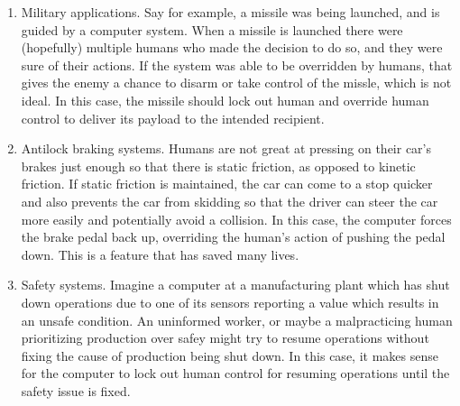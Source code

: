 \begin{enumerate}
  \item Military applications. Say for example, a missile was being launched,
    and is guided by a computer system. When a missile is launched there were
    (hopefully) multiple humans who made the decision to do so, and they were
    sure of their actions. If the system was able to be overridden by humans,
    that gives the enemy a chance to disarm or take control of the missle, which
    is not ideal. In this case, the missile should lock out human and override
    human control to deliver its payload to the intended recipient.

  \item Antilock braking systems. Humans are not great at pressing on their
    car's brakes just enough so that there is static friction, as opposed to
    kinetic friction. If static friction is maintained, the car can come to a
    stop quicker and also prevents the car from skidding so that the driver can
    steer the car more easily and potentially avoid a collision. In this case,
    the computer forces the brake pedal back up, overriding the human's action
    of pushing the pedal down. This is a feature that has saved many lives.

  \item Safety systems. Imagine a computer at a manufacturing plant which has
    shut down operations due to one of its sensors reporting a value which
    results in an unsafe condition. An uninformed worker, or maybe a
    malpracticing human prioritizing production over safey might try to resume
    operations without fixing the cause of production being shut down. In this
    case, it makes sense for the computer to lock out human control for resuming
    operations until the safety issue is fixed.
\end{enumerate}
